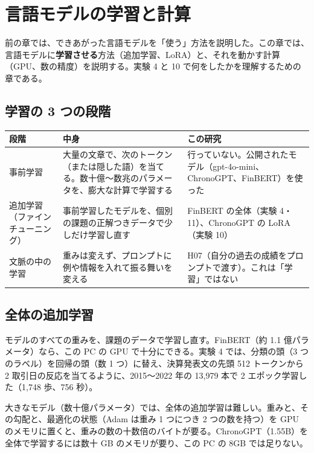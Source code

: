\chapter{言語モデルの学習と計算}\label{ch:llm}

前の章では、できあがった言語モデルを「使う」方法を説明した。この章では、言語モデルに\textbf{学習させる}方法（追加学習、LoRA）と、それを動かす計算（GPU、数の精度）を説明する。実験 4 と 10 で何をしたかを理解するための章である。

\section{学習の 3 つの段階}

\begin{longtable}{P{3.2cm}P{5.6cm}P{5.6cm}}
\toprule
\textbf{段階} & \textbf{中身} & \textbf{この研究} \\
\midrule
\endhead
\bottomrule
\endfoot
事前学習 & 大量の文章で、次のトークン（または隠した語）を当てる。数十億〜数兆のパラメータを、膨大な計算で学習する & 行っていない。公開されたモデル（gpt-4o-mini、ChronoGPT、FinBERT）を使った \\
追加学習（ファインチューニング） & 事前学習したモデルを、個別の課題の正解つきデータで少しだけ学習し直す & FinBERT の全体（実験 4・11）、ChronoGPT の LoRA（実験 10） \\
文脈の中の学習 & 重みは変えず、プロンプトに例や情報を入れて振る舞いを変える & H07（自分の過去の成績をプロンプトで渡す）。これは「学習」ではない \\
\end{longtable}

\section{全体の追加学習}

モデルのすべての重みを、課題のデータで学習し直す。FinBERT（約 1.1 億パラメータ）なら、この PC の GPU で十分にできる。実験 4 では、分類の頭（3 つのラベル）を回帰の頭（数 1 つ）に替え、決算発表文の先頭 512 トークンから 2 取引日の反応を当てるように、2015〜2022 年の 13,979 本で 2 エポック学習した（1,748 歩、756 秒）。

大きなモデル（数十億パラメータ）では、全体の追加学習は難しい。重みと、その勾配と、最適化の状態（Adam は重み 1 つにつき 2 つの数を持つ）を GPU のメモリに置くと、重みの数の十数倍のバイトが要る。ChronoGPT（1.55B）を全体で学習するには数十 GB のメモリが要り、この PC の 8GB では足りない。

